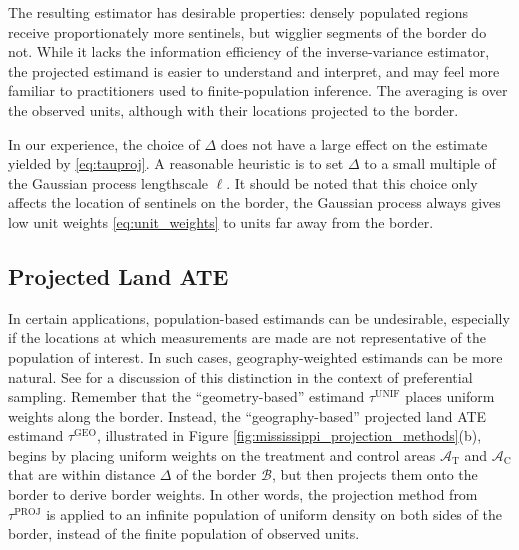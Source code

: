 \documentclass[letter]{article}
\newcommand{\area}{\mathcal{A}}
\newcommand{\treat}{\mathrm{T}}
\newcommand{\ctrol}{\mathrm{C}}
\newcommand{\border}{\mathcal{B}}
\newcommand{\unifavg}{\tau^{\mathrm{UNIF}}}
\newcommand{\tauproj}{\tau^{\mathrm{PROJ}}}
\newcommand{\taugeo}{\tau^{\mathrm{GEO}}}
\newcommand{\buffer}{\Delta}
\renewcommand{\cite}[1]{\citet{#1}}
\begin{document}
The resulting estimator has desirable properties: densely populated regions receive proportionately more sentinels, but wigglier segments of the border do not.
While it lacks the information efficiency of the inverse-variance estimator,
the projected estimand is easier to understand and interpret,
and may feel more familiar to practitioners used to finite-population inference.
The averaging is over the observed units, although with their locations projected to the border.

In our experience, the choice of \(\buffer\) does not have a large effect on the estimate yielded by \eqref{eq:tauproj}.
A reasonable heuristic is to set \(\buffer\) to a small multiple of the Gaussian process lengthscale \(\ell\).
It should be noted that this choice only affects the location of sentinels on the border, the Gaussian process always gives low unit weights \eqref{eq:unit_weights} to units far away from the border.
    


    	\hypertarget{projected-land-ate}{%
\subsection{Projected Land ATE}\label{projected-land-ate}}

In certain applications, population-based estimands can be undesirable, especially if the locations at which measurements are made are not representative of the population of interest.
In such cases, geography-weighted estimands can be more natural.
See \cite{antonelli2016positive} for a discussion of this distinction in the context of preferential sampling.
Remember that the ``geometry-based'' estimand \(\unifavg\) places uniform weights along the border.
Instead, the ``geography-based'' projected land ATE estimand \(\taugeo\), illustrated in Figure \ref{fig:mississippi_projection_methods}(b), begins by placing uniform weights on the treatment and control areas \(\area_\treat\) and \(\area_\ctrol\) that are within distance \(\buffer\) of the border \(\border\), but then projects them onto the border to derive border weights.
In other words, the projection method from \(\tauproj\) is applied to an infinite population of uniform density on both sides of the border, instead of the finite population of observed units.
\end{document}
